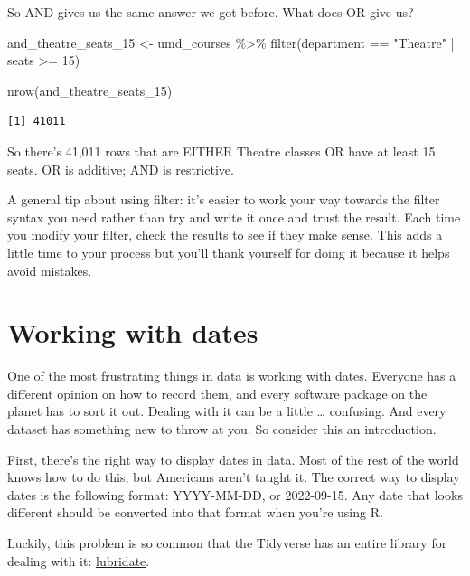 \documentclass[
  letterpaper,
  DIV=11,
  numbers=noendperiod]{scrreprt}
\newenvironment{Shaded}{\begin{snugshade}}{\end{snugshade}}
\newcommand{\DecValTok}[1]{\textcolor[rgb]{0.68,0.00,0.00}{#1}}
\newcommand{\FunctionTok}[1]{\textcolor[rgb]{0.28,0.35,0.67}{#1}}
\newcommand{\NormalTok}[1]{\textcolor[rgb]{0.00,0.23,0.31}{#1}}
\newcommand{\OtherTok}[1]{\textcolor[rgb]{0.00,0.23,0.31}{#1}}
\newcommand{\SpecialCharTok}[1]{\textcolor[rgb]{0.37,0.37,0.37}{#1}}
\newcommand{\StringTok}[1]{\textcolor[rgb]{0.13,0.47,0.30}{#1}}
\begin{document}
So AND gives us the same answer we got before. What does OR give us?

\begin{Shaded}
\begin{Highlighting}[]
\NormalTok{and\_theatre\_seats\_15 }\OtherTok{\textless{}{-}}\NormalTok{ umd\_courses }\SpecialCharTok{\%\textgreater{}\%} \FunctionTok{filter}\NormalTok{(department }\SpecialCharTok{==} \StringTok{"Theatre"} \SpecialCharTok{|}\NormalTok{ seats }\SpecialCharTok{\textgreater{}=} \DecValTok{15}\NormalTok{)}

\FunctionTok{nrow}\NormalTok{(and\_theatre\_seats\_15)}
\end{Highlighting}
\end{Shaded}

\begin{verbatim}
[1] 41011
\end{verbatim}

So there's 41,011 rows that are EITHER Theatre classes OR have at least
15 seats. OR is additive; AND is restrictive.

A general tip about using filter: it's easier to work your way towards
the filter syntax you need rather than try and write it once and trust
the result. Each time you modify your filter, check the results to see
if they make sense. This adds a little time to your process but you'll
thank yourself for doing it because it helps avoid mistakes.


\hypertarget{working-with-dates}{%
\chapter{Working with dates}\label{working-with-dates}}

One of the most frustrating things in data is working with dates.
Everyone has a different opinion on how to record them, and every
software package on the planet has to sort it out. Dealing with it can
be a little \ldots{} confusing. And every dataset has something new to
throw at you. So consider this an introduction.

First, there's the right way to display dates in data. Most of the rest
of the world knows how to do this, but Americans aren't taught it. The
correct way to display dates is the following format: YYYY-MM-DD, or
2022-09-15. Any date that looks different should be converted into that
format when you're using R.

Luckily, this problem is so common that the Tidyverse has an entire
library for dealing with it:
\href{https://lubridate.tidyverse.org/}{lubridate}.
\end{document}
